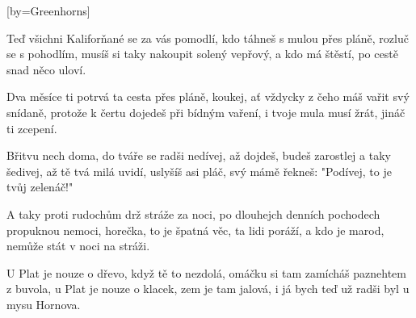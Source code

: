 [by={Greenhorns}]

\beginverse{}
Teď všichni Kaliforňané se za vás pomodlí,
kdo táhneš s mulou přes pláně, rozluč se s pohodlím,
musíš si taky nakoupit solený vepřový,
a kdo má štěstí, po cestě snad něco uloví.
\endverse{}

\beginverse{}
\chordsoff{}
Dva měsíce ti potrvá ta cesta přes pláně,
koukej, ať vždycky z čeho máš vařit svý snídaně,
protože k čertu dojedeš při bídným vaření,
i tvoje mula musí žrát, jináč ti zcepení.
\chordson{}
\endverse{}

\beginverse{}
\chordsoff{}
Břitvu nech doma, do tváře se radši nedívej,
až dojdeš, budeš zarostlej a taky šedivej,
až tě tvá milá uvidí, uslyšíš asi pláč,
svý mámě řekneš: "Podívej, to je tvůj zelenáč!"
\chordson{}
\endverse{}

\beginverse{}
\chordsoff{}
A taky proti rudochům drž stráže za noci,
po dlouhejch denních pochodech propuknou nemoci,
horečka, to je špatná věc, ta lidi poráží,
a kdo je marod, nemůže stát v noci na stráži.
\chordson{}
\endverse{}

\beginverse{}
\chordsoff{}
U Plat je nouze o dřevo, když tě to nezdolá,
omáčku si tam zamícháš paznehtem z buvola,
u Plat je nouze o klacek, zem je tam jalová,
i já bych teď už radši byl u mysu Hornova.
\chordson{}
\endverse{}

\endsong{}
